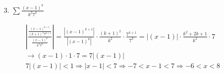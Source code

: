 \begin{itemize}
        \item [3.] $\sum\frac{(x-1)^{k}}{k^{2}7^{k}}$
        \\
        \begin{mdframed}
            \begin{equation*}
                \begin{gathered}
                    \left|\frac{\frac{(x-1)^{k+1}}{(k+1)^{2}7^{k+1}}}
                            {\frac{(x-1)^{k}}{k^{2}7^{k}}}\right| =
                            \frac{|(x-1)^{k+1}|}{|(x-1)^{k}|}\cdot
                            \frac{(k+1)^{2}}{k^{2}}\cdot
                            \frac{7^{k+1}}{7^{k}} =
                            |(x-1)|\cdot\frac{k^{2}+2k+1}{k^{2}}\cdot 7     \\
                            \rightarrow (x-1) \cdot 1 \cdot 7 = 7|(x-1)|    \\
                            7|(x-1)| < 1 \Rightarrow |x-1| < 7 \Rightarrow
                            -7 < x - 1 < 7 \Rightarrow -6 < x < 8
                \end{gathered}
            \end{equation*}
        \end{mdframed}
    \end{itemize}

